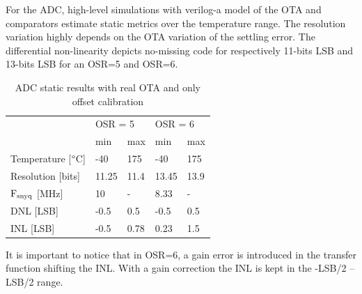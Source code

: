 For the ADC, high-level simulations with verilog-a model of the OTA and comparators estimate static metrics over the temperature range. The resolution variation highly depends on the OTA variation of the settling error. The differential non-linearity depicts no-missing code for respectively 11-bits LSB and 13-bits LSB for an OSR=5 and OSR=6.

\begin{table}[htp]
	\centering
	\caption{ADC static results with real OTA and only offset calibration}
	\begin{tabular}{@{}lllll@{}}
	\toprule
	 & \multicolumn{2}{l}{OSR = 5} & \multicolumn{2}{l}{OSR = 6} \\
	 & min & max & min & max \\ \midrule
	Temperature {[}$\degree$C{]} & -40 & 175 & -40 & 175 \\
	Resolution {[}bits{]} & 11.25 & 11.4 & 13.45 & 13.9 \\
	$\rm F_{snyq}$ {[}MHz{]} & 10 & - & 8.33 & - \\
	DNL {[}LSB{]} & -0.5 & 0.5 & -0.5 & 0.5 \\
	INL {[}LSB{]} & -0.5 & 0.78 & 0.23 & 1.5 \\ \bottomrule
	\end{tabular}
\end{table}

It is important to notice that in OSR=6, a gain error is introduced in the transfer function shifting the INL. With a gain correction the INL is kept in the -LSB/2 -- LSB/2 range.